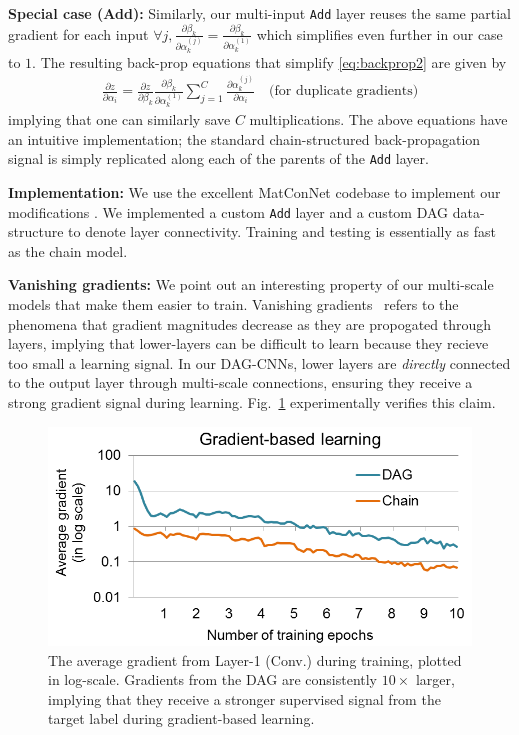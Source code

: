 \documentclass[10pt,twocolumn,letterpaper]{article}
\begin{document}
{\bf Special case (Add):} Similarly, our multi-input {\tt Add} layer reuses the same partial gradient for each input
$\forall j, \frac{\partial \beta_k}{\partial \alpha_k^{(j)}} = \frac{\partial \beta_k}{\partial \alpha_k^{(1)}}$ which simplifies even further in our case to $1$. The resulting back-prop equations that simplify \eqref{eq:backprop2} are given by
\vspace{-5pt}
\begin{align}
\frac{\partial z}{\partial \alpha_i} = \frac{\partial z}{\partial \beta_k} \frac{\partial \beta_k}{\partial \alpha_k^{(1)}}\sum_{j=1}^{C} \frac{\partial \alpha_k^{(j)}}{\partial \alpha_i}  \quad \text{(for duplicate gradients)}
\end{align}
\noindent implying that one can similarly save $C$ multiplications. The above equations have an intuitive implementation; the standard chain-structured back-propagation signal is simply replicated along each of the parents of the {\tt Add} layer.

{\bf Implementation:} We use the excellent MatConNet codebase to implement our modifications \cite{vedaldimatconvnet}. We implemented a custom {\tt Add} layer and a custom DAG data-structure to denote layer connectivity. Training and testing is essentially as fast as the chain model.

{\bf Vanishing gradients:} We point out an interesting property of our multi-scale models that make them easier to train. Vanishing gradients~\cite{bengio1994learning} refers to the phenomena that gradient magnitudes decrease as they are propogated through layers, implying that lower-layers can be difficult to learn because they recieve too small a learning signal. In our DAG-CNNs, lower layers are {\em directly} connected to the output layer through multi-scale connections, ensuring they receive a strong gradient signal during learning. Fig.~\ref{fig:grad} experimentally verifies this claim.

\begin{figure}[htbp]
\centering
\includegraphics[width=.8\columnwidth]{fig/fig_grad}
\caption{The average gradient from Layer-1 (Conv.) during training, plotted in log-scale. Gradients from the DAG are consistently $10\times$ larger, implying that they receive a stronger supervised signal from the target label during gradient-based learning.}
\label{fig:grad}
\end{figure}
\end{document}
